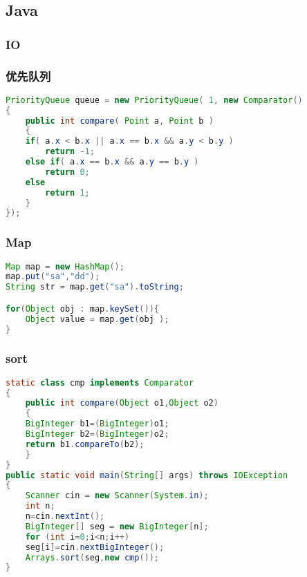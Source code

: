\subsection{Java}
    \subsubsection{IO}
	
    \subsubsection{优先队列}
	\begin{lstlisting}[language=java]
PriorityQueue queue = new PriorityQueue( 1, new Comparator()
{
    public int compare( Point a, Point b )
    {
	if( a.x < b.x || a.x == b.x && a.y < b.y )
	    return -1;
	else if( a.x == b.x && a.y == b.y )
	    return 0;
	else
	    return 1;
    }
});
	\end{lstlisting}
	
    \subsubsection{Map}
	\begin{lstlisting}[language=java]
Map map = new HashMap();
map.put("sa","dd");
String str = map.get("sa").toString;

for(Object obj : map.keySet()){
    Object value = map.get(obj );
}
	\end{lstlisting}
	
    \subsubsection{sort}
	\begin{lstlisting}[language=java]
static class cmp implements Comparator
{
    public int compare(Object o1,Object o2)
    {
	BigInteger b1=(BigInteger)o1;
	BigInteger b2=(BigInteger)o2;
	return b1.compareTo(b2);
    }
}
public static void main(String[] args) throws IOException
{
    Scanner cin = new Scanner(System.in);
    int n;
    n=cin.nextInt();
    BigInteger[] seg = new BigInteger[n];
    for (int i=0;i<n;i++)
	seg[i]=cin.nextBigInteger();
    Arrays.sort(seg,new cmp());
}
	\end{lstlisting}